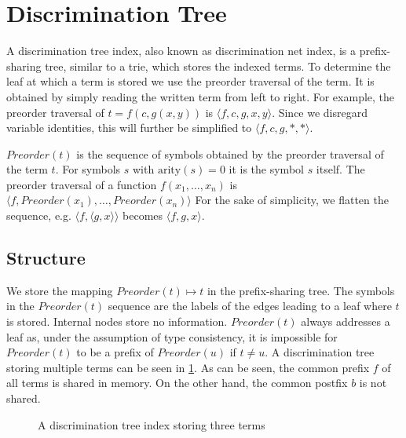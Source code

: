 \section{Discrimination Tree}
A discrimination tree index, also known as discrimination net index, is a prefix-sharing tree, similar to a trie, which stores the indexed terms. To determine the leaf at which a term is stored we use the preorder traversal of the term. It is obtained by simply reading the written term from left to right. For example, the preorder traversal of $t = f(c,g(x,y))$ is $\langle f,c,g,x,y \rangle$. Since we disregard variable identities, this will further be simplified to $\langle f,c,g,*,* \rangle$.

\begin{defn}
  $Preorder(t)$ is the sequence of symbols obtained by the preorder traversal of the term $t$. For symbols $s$ with $\mathrm{arity}(s) = 0$ it is the symbol $s$ itself. The preorder traversal of a function $f(x_{1},\dots,x_{n})$ is $\langle f,Preorder(x_{1}),\dots,Preorder(x_{n}) \rangle$ For the sake of simplicity, we flatten the sequence, e.g. $\langle f,\langle g,x \rangle \rangle$ becomes $\langle f,g,x \rangle$.
\end{defn}

\subsection{Structure}
We store the mapping $Preorder(t) \mapsto t$ in the prefix-sharing tree. The symbols in the $Preorder(t)$ sequence are the labels of the edges leading to a leaf where $t$ is stored. Internal nodes store no information.
$Preorder(t)$ always addresses a leaf as, under the assumption of type consistency, it is impossible for $Preorder(t)$ to be a prefix of $Preorder(u)$ if $t \neq u$.
A discrimination tree storing multiple terms can be seen in \cref{discnet}. As can be seen, the common prefix $f$ of all terms is shared in memory. On the other hand, the common postfix $b$ is not shared.

\begin{figure}[h]
  \centering
{}
  \caption{A discrimination tree index storing three terms} \label{discnet}
\end{figure}


